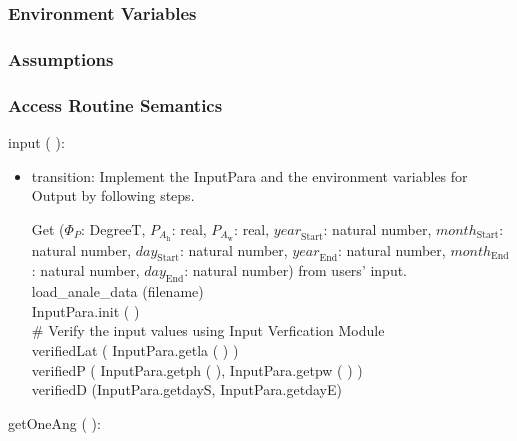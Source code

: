 \documentclass[12pt, titlepage]{article}
\begin{document}
\subsubsection{Environment Variables}


\subsubsection{Assumptions}


\subsubsection{ Access Routine Semantics}

\noindent  input ( ):

\begin{itemize}
\item transition: Implement the InputPara and  the environment variables for Output by following steps.

Get ($\Phi_P$: DegreeT, $P_{A_{\text{h}}}$: real, $P_{A_{\text{w}}}$: real, $\mathit{year}_\text{Start}$: natural number, $\mathit{month}_\text{Start}$: natural number, $\mathit{day}_\text{Start}$: natural number, $\mathit{year}_\text{End}$: natural number, $\mathit{month}_\text{End}$: natural number, $\mathit{day}_\text{End}$: natural number) from users' input.\\


load\_anale\_data (filename)\\
InputPara.init ( )\\

$\#$ Verify the input values using Input Verfication Module\\
verifiedLat ( InputPara.getla ( ) )\\
verifiedP ( InputPara.getph ( ), InputPara.getpw ( ) )\\
verifiedD (InputPara.getdayS, InputPara.getdayE)\\


\end{itemize}

\noindent  getOneAng ( ):
\end{document}

